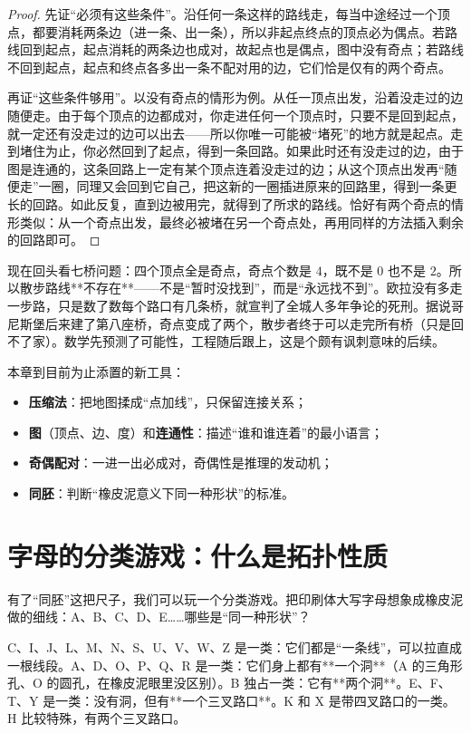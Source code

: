 \begin{proof}
先证“必须有这些条件”。沿任何一条这样的路线走，每当中途经过一个顶点，都要消耗两条边（进一条、出一条），所以非起点终点的顶点必为偶点。若路线回到起点，起点消耗的两条边也成对，故起点也是偶点，图中没有奇点；若路线不回到起点，起点和终点各多出一条不配对用的边，它们恰是仅有的两个奇点。

再证“这些条件够用”。以没有奇点的情形为例。从任一顶点出发，沿着没走过的边随便走。由于每个顶点的边都成对，你走进任何一个顶点时，只要不是回到起点，就一定还有没走过的边可以出去——所以你唯一可能被“堵死”的地方就是起点。走到堵住为止，你必然回到了起点，得到一条回路。如果此时还有没走过的边，由于图是连通的，这条回路上一定有某个顶点连着没走过的边；从这个顶点出发再“随便走”一圈，同理又会回到它自己，把这新的一圈插进原来的回路里，得到一条更长的回路。如此反复，直到边被用完，就得到了所求的路线。恰好有两个奇点的情形类似：从一个奇点出发，最终必被堵在另一个奇点处，再用同样的方法插入剩余的回路即可。
\end{proof}

现在回头看七桥问题：四个顶点全是奇点，奇点个数是 $4$，既不是 $0$ 也不是 $2$。所以散步路线**不存在**——不是“暂时没找到”，而是“永远找不到”。欧拉没有多走一步路，只是数了数每个路口有几条桥，就宣判了全城人多年争论的死刑。据说哥尼斯堡后来建了第八座桥，奇点变成了两个，散步者终于可以走完所有桥（只是回不了家）。数学先预测了可能性，工程随后跟上，这是个颇有讽刺意味的后续。

\begin{toolbox}
本章到目前为止添置的新工具：
\begin{itemize}
  \item \textbf{压缩法}：把地图揉成“点加线”，只保留连接关系；
  \item \textbf{图}（顶点、边、度）和\textbf{连通性}：描述“谁和谁连着”的最小语言；
  \item \textbf{奇偶配对}：一进一出必成对，奇偶性是推理的发动机；
  \item \textbf{同胚}：判断“橡皮泥意义下同一种形状”的标准。
\end{itemize}
\end{toolbox}

\section{字母的分类游戏：什么是拓扑性质}

有了“同胚”这把尺子，我们可以玩一个分类游戏。把印刷体大写字母想象成橡皮泥做的细线：A、B、C、D、E……哪些是“同一种形状”？

C、I、J、L、M、N、S、U、V、W、Z 是一类：它们都是“一条线”，可以拉直成一根线段。A、D、O、P、Q、R 是一类：它们身上都有**一个洞**（A 的三角形孔、O 的圆孔，在橡皮泥眼里没区别）。B 独占一类：它有**两个洞**。E、F、T、Y 是一类：没有洞，但有**一个三叉路口**。K 和 X 是带四叉路口的一类。H 比较特殊，有两个三叉路口。

